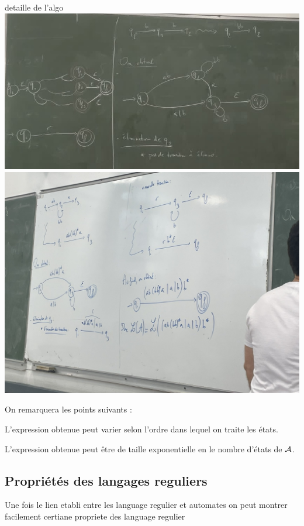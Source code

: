 \documentclass[a4paper,french,bookmarks]{book}
\begin{document}
\begin{example}{detaille de l'algo }{}
        \vspace{2cm}
        \includegraphics[scale=0.2]{Dessin/Tableau3.jpeg}
        \vspace{2cm}
        \includegraphics[scale=0.2]{Dessin/Tableau4.jpeg}
        
        
    \end{example}
    
    On remarquera les points suivants :
    \begin{enumerate}
        \itt L'expression obtenue peut varier selon l'ordre dans lequel on traite les états.
        
        \itt L'expression obtenue peut être de taille exponentielle en le nombre d'états de $\mathcal{A}$.
    \end{enumerate}
    
    \subsection{Propriétés des langages reguliers}
        Une fois le lien etabli entre les language regulier et automates on peut montrer facilement certiane propriete des language regulier 
        
\end{document}
